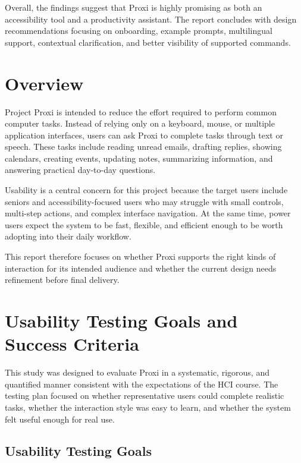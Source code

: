 \documentclass[12pt, titlepage]{article}
\begin{document}
Overall, the findings suggest that Proxi is highly promising as both an
accessibility tool and a productivity assistant. The report concludes
with design recommendations focusing on onboarding, example prompts,
multilingual support, contextual clarification, and better visibility
of supported commands.

\section{Overview}

Project Proxi is intended to reduce the effort required to perform
common computer tasks. Instead of relying only on a keyboard, mouse, or
multiple application interfaces, users can ask Proxi to complete tasks
through text or speech. These tasks include reading unread emails,
drafting replies, showing calendars, creating events, updating notes,
summarizing information, and answering practical day-to-day questions.

Usability is a central concern for this project because the target users
include seniors and accessibility-focused users who may struggle with
small controls, multi-step actions, and complex interface navigation.
At the same time, power users expect the system to be fast, flexible,
and efficient enough to be worth adopting into their daily workflow.

This report therefore focuses on whether Proxi supports the right kinds
of interaction for its intended audience and whether the current design
needs refinement before final delivery.

\section{Usability Testing Goals and Success Criteria}

This study was designed to evaluate Proxi in a systematic, rigorous,
and quantified manner consistent with the expectations of the HCI
course. The testing plan focused on whether representative users could
complete realistic tasks, whether the interaction style was easy to
learn, and whether the system felt useful enough for real use.

\subsection{Usability Testing Goals}
\end{document}
